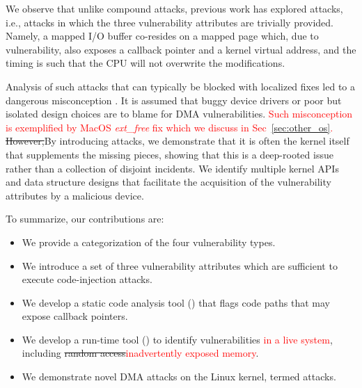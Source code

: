 We observe that unlike compound attacks, previous work has explored \simple{} attacks, i.e., attacks in which the three vulnerability attributes are trivially provided. 
Namely, a mapped I/O buffer co-resides on a mapped page which, due to \subpage{} vulnerability, also exposes a callback pointer and a kernel virtual address, and the timing is such that the CPU will not overwrite the modifications.

Analysis of such \simple{} attacks that can typically be blocked with localized fixes led to a dangerous misconception . It is assumed that buggy device drivers or poor but isolated design choices are to blame for DMA vulnerabilities. \textcolor{red}{Such misconception is exemplified by MacOS \textit{ext\_free} fix which we discuss in Sec~\ref{sec:other_os}.}
\sout{However,}By introducing \compound attacks, we demonstrate that it is often the kernel itself that supplements the missing pieces, showing that this is a deep-rooted issue rather than a collection of disjoint incidents.
We identify multiple kernel APIs and data structure designs that facilitate the acquisition of the vulnerability attributes by a malicious device.


To summarize, our contributions are:
\begin{itemize}
    \item We provide a categorization of the four \subpage{} vulnerability types.
    \item We introduce a set of three vulnerability attributes which are sufficient to execute code-injection attacks.
    \item We develop a static code analysis tool (\tool) that flags code paths that may expose callback pointers.
    \item We develop a run-time tool (\dkasan) to identify \subpage{} vulnerabilities\textcolor{red}{ in a live system}, including \sout{random access}\textcolor{red}{inadvertently exposed memory}.
    \item We demonstrate novel DMA attacks on the Linux kernel, termed \compound{} attacks.
\end{itemize}

